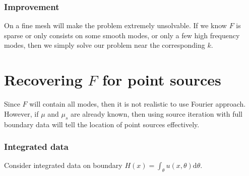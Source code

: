 \documentclass[12pt,a4paper]{article}
\begin{document}
\subsubsection{Improvement}
On a fine mesh will make the problem extremely unsolvable. If we know $F$ is sparse or only consists on some smooth modes, or only a few high frequency modes, then we simply solve our problem near the corresponding $k$.
\section{Recovering $F$ for point sources}
Since $F$ will contain all modes, then it is not realistic to use Fourier approach. However, if $\mu$ and $\mu_s$ are already known, then using source iteration with full boundary data will tell the location of point sources effectively.
\subsubsection{Integrated data}
Consider integrated data on boundary $H(x) = \int_{\theta} u(x,\theta) \mathrm{d}\theta$.
\end{document}
